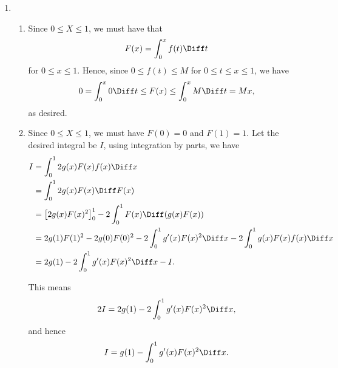 \Question{\currfilebase}

\begin{enumerate}
    \item \begin{enumerate}
              \item Since \(0 \leq X \leq 1\), we must have that
                    \[
                        F(x) = \int_{0}^{x} f(t) \Diff t
                    \]
                    for \(0 \leq x \leq 1\). Hence, since \(0 \leq f(t) \leq M\) for \(0 \leq t \leq x \leq 1\), we have
                    \[
                        0 = \int_{0}^{x} 0 \Diff t \leq F(x) \leq \int_{0}^{x} M \Diff t = Mx,
                    \]
                    as desired.

              \item Since \(0 \leq X \leq 1\), we must have \(F(0) = 0\) and \(F(1) = 1\). Let the desired integral be \(I\), using integration by parts, we have
                    \begin{align*}
                        I & = \int_{0}^{1} 2g(x) F(x) f(x) \Diff x                                                                      \\
                          & = \int_{0}^{1} 2 g(x) F(x) \Diff F(x)                                                                       \\
                          & = \left[2g(x) F(x)^2\right]_{0}^{1} - 2 \int_{0}^{1} F(x) \Diff (g(x) F(x))                                 \\
                          & = 2g(1) F(1)^2 - 2g(0) F(0)^2 - 2 \int_{0}^{1} g'(x) F(x)^2 \Diff x - 2\int_{0}^{1}  g(x) F(x) f(x) \Diff x \\
                          & = 2g(1) - 2\int_{0}^{1} g'(x) F(x)^2 \Diff x - I.
                    \end{align*}

                    This means
                    \[
                        2 I = 2 g(1) - 2 \int_{0}^{1} g'(x) F(x)^2 \Diff x,
                    \]
                    and hence
                    \[
                        I = g(1) - \int_{0}^{1} g'(x) F(x)^2 \Diff x.
                    \]
          \end{enumerate}


\end{enumerate}
